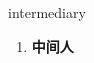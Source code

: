 
\begin{frame}
{\huge intermediary}
\begin{center}
\begin{enumerate}\Large
  \item \textbf{中间人}
\end{enumerate}
\end{center}
\end{frame}

